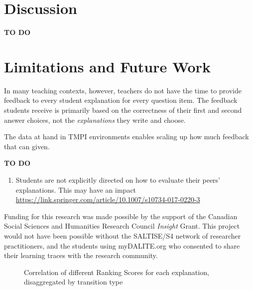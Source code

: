 \documentclass[sigconf]{acmart}
\begin{document}
%






\section{Discussion}
\textbf{TO DO}


\section{Limitations and Future Work}

In many teaching contexts, however, teachers do not have the time to provide 
feedback to every student explanation for every question item. 
The feedback students receive is primarily based on the correctness of their 
first and second answer choices, not the \textit{explanations} they write and 
choose.

The data at hand in TMPI environments enables scaling up how much feedback that 
can given.



\textbf{TO DO}

\begin{enumerate}
	\item Students are not explicitly directed on how to evaluate their peers' 
	explanations. This may have an impact 
	 \url{https://link.springer.com/article/10.1007/s10734-017-0220-3}
\end{enumerate}

\begin{acks}
Funding for this research was made possible by the support of the Canadian 
Social Sciences and Humanities Research Council \textit{Insight} Grant. This 
project would not have been possible without the SALTISE/S4 network of 
researcher practitioners, and the students using myDALITE.org who consented to 
share their learning traces with the research community.
\end{acks}


\begin{figure*}
	\scalebox{0.4}{}
	\caption{
		Correlation of different Ranking Scores for each explanation, 
		disaggregated by transition type  
	}
	\label{fig:acc_by_rank_score_type}
\end{figure*}




\end{document}

